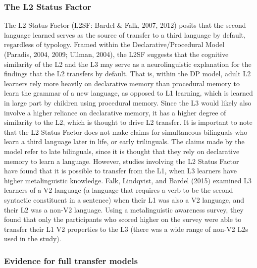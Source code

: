 \documentclass[
  english,
  man]{apa6}
\begin{document}
\hypertarget{the-l2-status-factor}{%
\subsubsection{The L2 Status Factor}\label{the-l2-status-factor}}

The L2 Status Factor (L2SF: Bardel \& Falk, 2007, 2012) posits that the second language learned serves as the source of transfer to a third language by default, regardless of typology.
Framed within the Declarative/Procedural Model (Paradis, 2004, 2009; Ullman, 2004), the L2SF suggests that the cognitive similarity of the L2 and the L3 may serve as a neurolinguistic explanation for the findings that the L2 transfers by default.
That is, within the DP model, adult L2 learners rely more heavily on declarative memory than procedural memory to learn the grammar of a new language, as opposed to L1 learning, which is learned in large part by children using procedural memory.
Since the L3 would likely also involve a higher reliance on declarative memory, it has a higher degree of similarity to the L2, which is thought to drive L2 transfer.
It is important to note that the L2 Status Factor does not make claims for simultaneous bilinguals who learn a third language later in life, or early trilinguals.
The claims made by the model refer to late bilinguals, since it is thought that they rely on declarative memory to learn a language.
However, studies involving the L2 Status Factor have found that it is possible to transfer from the L1, when L3 learners have higher metalinguistic knowledge.
Falk, Lindqvist, and Bardel (2015) examined L3 learners of a V2 language (a language that requires a verb to be the second syntactic constituent in a sentence) when their L1 was also a V2 language, and their L2 was a non-V2 language.
Using a metalinguistic awareness survey, they found that only the participants who scored higher on the survey were able to transfer their L1 V2 properties to the L3 (there was a wide range of non-V2 L2s used in the study).

\hypertarget{evidence-for-full-transfer-models}{%
\subsubsection{Evidence for full transfer models}\label{evidence-for-full-transfer-models}}
\end{document}
